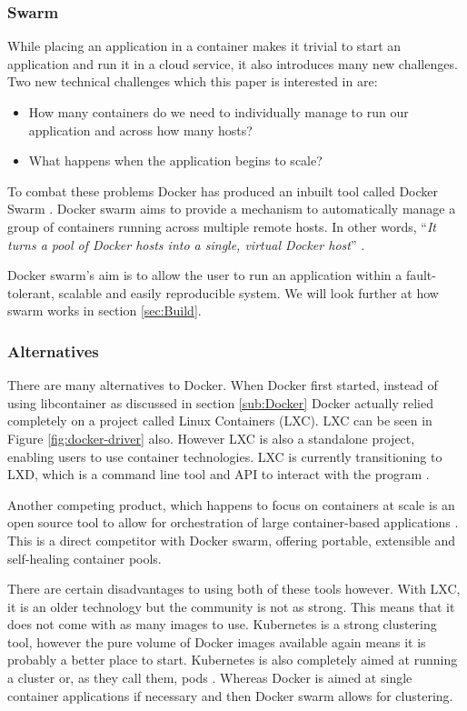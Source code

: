 \documentclass{article}
\begin{document}
\subsubsection{Swarm}
\label{subs:Swarm}
While placing an application in a container makes it trivial to start an application and run it in a cloud service, it also introduces many new challenges. Two new technical challenges which this paper is interested in are:
\begin{itemize}
  \item How many containers do we need to individually manage to run our application and across how many hosts? 
  \item What happens when the application begins to scale? 
\end{itemize}

To combat these problems Docker has produced an inbuilt tool called Docker Swarm \citep{Swarm2016}. Docker swarm aims to provide a mechanism to automatically manage a group of containers running across multiple remote hosts. In other words, ``\textit{It turns a pool of Docker hosts into a single, virtual Docker host}'' \citep{Swarm2016}.

Docker swarm's aim is to allow the user to run an application within a fault-tolerant, scalable and easily reproducible system. We will look further at how swarm works in section \ref{sec:Build}.

\subsubsection{Alternatives}
\label{subs:Docker-alt}
There are many alternatives to Docker. When Docker first started, instead of using libcontainer as discussed in section \ref{sub:Docker} Docker actually relied completely on a project called Linux Containers (LXC). LXC can be seen in Figure \ref{fig:docker-driver} also. However LXC is also a standalone project, enabling users to use container technologies. LXC is currently transitioning to LXD, which is a command line tool and API to interact with the program \citep{LXC2016}. 

Another competing product, which happens to focus on containers at scale is an open source tool to allow for orchestration of large container-based applications \citep{Kubernetes2016}. This is a direct competitor with Docker swarm, offering portable, extensible and self-healing container pools.

There are certain disadvantages to using both of these tools however. With LXC, it is an older technology but the community is not as strong. This means that it does not come with as many images to use. Kubernetes is a strong clustering tool, however the pure volume of Docker images available again means it is probably a better place to start. Kubernetes is also completely aimed at running a cluster or, as they call them, pods \citep{Kubernetes2016}. Whereas Docker is aimed at single container applications if necessary and then Docker swarm allows for clustering.
\end{document}
